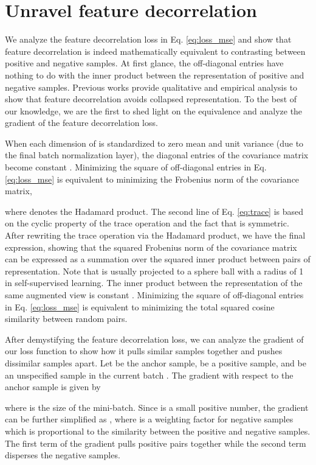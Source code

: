 \documentclass{article}
\begin{document}
\section{Unravel feature decorrelation} \label{sec:decorrelation}
We analyze the feature decorrelation loss in Eq. \eqref{eq:loss_mse} and show that feature decorrelation is indeed mathematically equivalent to contrasting between positive and negative samples. At first glance, the off-diagonal entries have nothing to do with the inner product between the representation of positive and negative samples. Previous works \citep{Zbontar:etal:2021barlow,hua:etal:2021feature} provide qualitative and empirical analysis to show that feature decorrelation avoids collapsed representation. To the best of our knowledge, we are the first to shed light on the equivalence and analyze the gradient of  the feature decorrelation loss.

When each dimension of  is standardized to zero mean and unit variance (due to the final batch normalization layer), the diagonal entries of the covariance matrix  become constant . Minimizing the square of off-diagonal entries in Eq. \eqref{eq:loss_mse} is equivalent to minimizing the Frobenius norm of the covariance matrix,

where  denotes the Hadamard product. The second line of Eq. \eqref{eq:trace} is based on the cyclic property of the trace operation and the fact that  is symmetric. After rewriting the trace operation via the Hadamard product, we have the final expression, showing that the squared Frobenius norm of the covariance matrix can be expressed as a summation over the squared inner product between pairs of representation. Note that  is usually projected to a sphere ball with a radius of 1 in self-supervised learning. The inner product between the representation of the same augmented view is constant . Minimizing the square of off-diagonal entries in Eq. \eqref{eq:loss_mse} is equivalent to minimizing the total squared cosine similarity between random pairs.

After demystifying the feature decorrelation loss, we can analyze the gradient of our loss function to show how it pulls similar samples together and pushes dissimilar samples apart. Let  be the anchor sample,  be a positive sample, and  be an unspecified sample in the current batch . The gradient with respect to the anchor sample is given by 

where  is the size of the mini-batch. Since  is a small positive number, the gradient can be further simplified as , where  is a weighting factor for negative samples which is proportional to the similarity between the positive and negative samples. The first term of the gradient pulls positive pairs together while the second term disperses the negative samples.
\end{document}
